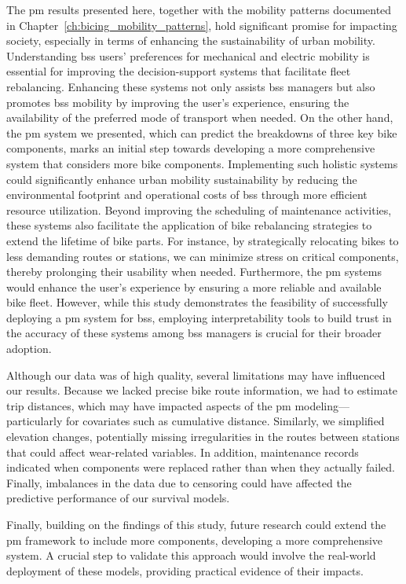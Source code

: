 The \ac{pm} results presented here, together with the mobility patterns documented in Chapter~\ref{ch:bicing_mobility_patterns}, hold significant promise for impacting society, especially in terms of enhancing the sustainability of urban mobility. Understanding \ac{bss} users' preferences for mechanical and electric mobility is essential for improving the decision-support systems that facilitate fleet rebalancing. Enhancing these systems not only assists \ac{bss} managers but also promotes \ac{bss} mobility by improving the user's experience, ensuring the availability of the preferred mode of transport when needed. On the other hand, the \ac{pm} system we presented, which can predict the breakdowns of three key bike components, marks an initial step towards developing a more comprehensive system that considers more bike components. Implementing such holistic systems could significantly enhance urban mobility sustainability by reducing the environmental footprint and operational costs of \ac{bss} through more efficient resource utilization. Beyond improving the scheduling of maintenance activities, these systems also facilitate the application of bike rebalancing strategies to extend the lifetime of bike parts. For instance, by strategically relocating bikes to less demanding routes or stations, we can minimize stress on critical components, thereby prolonging their usability when needed. Furthermore, the \ac{pm} systems would enhance the user's experience by ensuring a more reliable and available bike fleet. However, while this study demonstrates the feasibility of successfully deploying a \ac{pm} system for \ac{bss}, employing interpretability tools to build trust in the accuracy of these systems among \ac{bss} managers is crucial for their broader adoption. 

Although our data was of high quality, several limitations may have influenced our results. Because we lacked precise bike route information, we had to estimate trip distances, which may have impacted aspects of the \ac{pm} modeling—particularly for covariates such as cumulative distance. Similarly, we simplified elevation changes, potentially missing irregularities in the routes between stations that could affect wear-related variables. In addition, maintenance records indicated when components were replaced rather than when they actually failed. Finally, imbalances in the data due to censoring could have affected the predictive performance of our survival models.

Finally, building on the findings of this study, future research could extend the \ac{pm} framework to include more components, developing a more comprehensive system. A crucial step to validate this approach would involve the real-world deployment of these models, providing practical evidence of their impacts.
